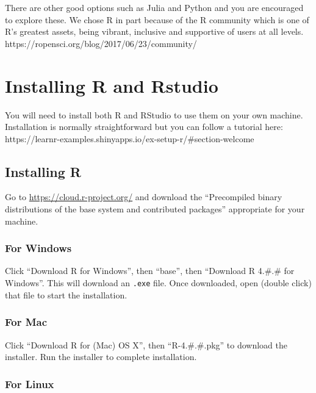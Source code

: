 \documentclass[
  letterpaper,
  DIV=11,
  numbers=noendperiod]{scrreprt}
\begin{document}
There are other good options such as Julia and Python and you are
encouraged to explore these. We chose R in part because of the R
community which is one of R's greatest assets, being vibrant, inclusive
and supportive of users at all levels.
https://ropensci.org/blog/2017/06/23/community/

\hypertarget{installing-r-and-rstudio}{%
\section{Installing R and Rstudio}\label{installing-r-and-rstudio}}

You will need to install both R and RStudio to use them on your own
machine. Installation is normally straightforward but you can follow a
tutorial here:
https://learnr-examples.shinyapps.io/ex-setup-r/\#section-welcome

\hypertarget{installing-r}{%
\subsection{Installing R}\label{installing-r}}

Go to \url{https://cloud.r-project.org/} and download the ``Precompiled
binary distributions of the base system and contributed packages''
appropriate for your machine.

\hypertarget{for-windows}{%
\subsubsection{For Windows}\label{for-windows}}

Click ``Download R for Windows'', then ``base'', then ``Download R
4.\#.\# for Windows''. This will download an \texttt{.exe} file. Once
downloaded, open (double click) that file to start the installation.

\hypertarget{for-mac}{%
\subsubsection{For Mac}\label{for-mac}}

Click ``Download R for (Mac) OS X'', then ``R-4.\#.\#.pkg'' to download
the installer. Run the installer to complete installation.

\hypertarget{for-linux}{%
\subsubsection{For Linux}\label{for-linux}}
\end{document}

